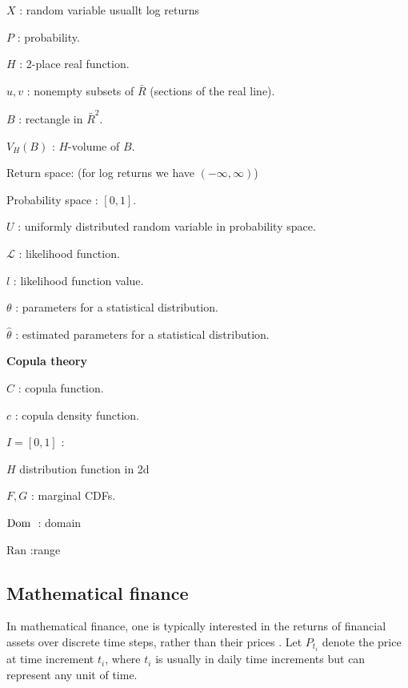 \begin{generalinstructions}
\begin{compactitem}
        \item $X$ : random variable usuallt log returns
        \item $P$ : probability.
        \item $H$ : 2-place real function.
        \item $u,v$ : nonempty subsets of $\bar{R}$ (sections of the real line).
        \item $B$ : rectangle in $\bar{R}^2$.
        \item $V_H(B)$ : $H$-volume of $B$.
        \item Return space: (for log returns we have $(-\infty, \infty)$)
        \item Probability space  : $[0,1]$.
        \item $U$ : uniformly distributed random variable in probability space.
        \item $\mathcal{L}$ : likelihood function.
        \item $l$ : likelihood function value.
        \item $\theta$ : parameters for a statistical distribution.
        \item $\hat{\theta}$ : estimated parameters for a statistical distribution.
        \item \textbf{Copula theory}
        \item $C$ : copula function.
        \item $c$ : copula density function.
        \item $I= [0,1]$ : 
        \item $H$ distribution function in 2d
        \item $F,G$ : marginal \gls{CDF}s.
        \item $\mathrm{Dom \;}$ : domain
        \item $\mathrm{Ran}$ :range
    \end{compactitem}
\end{generalinstructions}



\subsection{Mathematical finance}\label{sec:MathematicalFinance}
In mathematical finance, one is typically interested in the returns of financial assets over discrete time steps, rather than their prices \citet[p.~2]{Danielsson2011}. Let $P_{t_i}$ denote the price at time increment $t_i$, where $t_i$ is usually in daily time increments but can represent any unit of time. 

